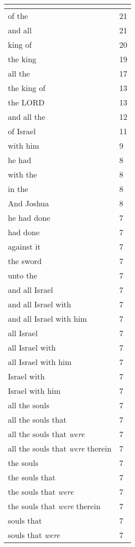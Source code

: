 \begin{center}
\begin{longtable}{|p{3.0in}|p{0.5in}|}
\hline \multicolumn{2}{c}{{ }} \\ \hline
\endfoot 
of the & 21\\ \hline 
and all & 21\\ \hline 
king of & 20\\ \hline 
the king & 19\\ \hline 
all the & 17\\ \hline 
the king of & 13\\ \hline 
the LORD & 13\\ \hline 
and all the & 12\\ \hline 
of Israel & 11\\ \hline 
with him & 9\\ \hline 
he had & 8\\ \hline 
with the & 8\\ \hline 
in the & 8\\ \hline 
And Joshua & 8\\ \hline 
he had done & 7\\ \hline 
had done & 7\\ \hline 
against it & 7\\ \hline 
the sword & 7\\ \hline 
unto the & 7\\ \hline 
and all Israel & 7\\ \hline 
and all Israel with & 7\\ \hline 
and all Israel with him & 7\\ \hline 
all Israel & 7\\ \hline 
all Israel with & 7\\ \hline 
all Israel with him & 7\\ \hline 
Israel with & 7\\ \hline 
Israel with him & 7\\ \hline 
all the souls & 7\\ \hline 
all the souls that & 7\\ \hline 
all the souls that \emph{were} & 7\\ \hline 
all the souls that \emph{were} therein & 7\\ \hline 
the souls & 7\\ \hline 
the souls that & 7\\ \hline 
the souls that \emph{were} & 7\\ \hline 
the souls that \emph{were} therein & 7\\ \hline 
souls that & 7\\ \hline 
souls that \emph{were} & 7\\ \hline 

\end{longtable}
\end{center}
